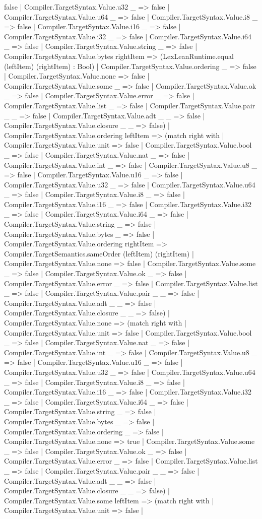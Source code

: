 \documentclass[11pt]{article}
\begin{document}
false | Compiler.TargetSyntax.Value.u32 \_ => false | Compiler.TargetSyntax.Value.u64 \_ => false | Compiler.TargetSyntax.Value.i8 \_ => false | Compiler.TargetSyntax.Value.i16 \_ => false | Compiler.TargetSyntax.Value.i32 \_ => false | Compiler.TargetSyntax.Value.i64 \_ => false | Compiler.TargetSyntax.Value.string \_ => false | Compiler.TargetSyntax.Value.bytes rightItem => (LexLeanRuntime.equal (leftItem) (rightItem) : Bool) | Compiler.TargetSyntax.Value.ordering \_ => false | Compiler.TargetSyntax.Value.none => false | Compiler.TargetSyntax.Value.some \_ => false | Compiler.TargetSyntax.Value.ok \_ => false | Compiler.TargetSyntax.Value.error \_ => false | Compiler.TargetSyntax.Value.list \_ => false | Compiler.TargetSyntax.Value.pair \_ \_ => false | Compiler.TargetSyntax.Value.adt \_ \_ => false | Compiler.TargetSyntax.Value.closure \_ \_ => false) | Compiler.TargetSyntax.Value.ordering leftItem => (match right with | Compiler.TargetSyntax.Value.unit => false | Compiler.TargetSyntax.Value.bool \_ => false | Compiler.TargetSyntax.Value.nat \_ => false | Compiler.TargetSyntax.Value.int \_ => false | Compiler.TargetSyntax.Value.u8 \_ => false | Compiler.TargetSyntax.Value.u16 \_ => false | Compiler.TargetSyntax.Value.u32 \_ => false | Compiler.TargetSyntax.Value.u64 \_ => false | Compiler.TargetSyntax.Value.i8 \_ => false | Compiler.TargetSyntax.Value.i16 \_ => false | Compiler.TargetSyntax.Value.i32 \_ => false | Compiler.TargetSyntax.Value.i64 \_ => false | Compiler.TargetSyntax.Value.string \_ => false | Compiler.TargetSyntax.Value.bytes \_ => false | Compiler.TargetSyntax.Value.ordering rightItem => Compiler.TargetSemantics.sameOrder (leftItem) (rightItem) | Compiler.TargetSyntax.Value.none => false | Compiler.TargetSyntax.Value.some \_ => false | Compiler.TargetSyntax.Value.ok \_ => false | Compiler.TargetSyntax.Value.error \_ => false | Compiler.TargetSyntax.Value.list \_ => false | Compiler.TargetSyntax.Value.pair \_ \_ => false | Compiler.TargetSyntax.Value.adt \_ \_ => false | Compiler.TargetSyntax.Value.closure \_ \_ => false) | Compiler.TargetSyntax.Value.none => (match right with | Compiler.TargetSyntax.Value.unit => false | Compiler.TargetSyntax.Value.bool \_ => false | Compiler.TargetSyntax.Value.nat \_ => false | Compiler.TargetSyntax.Value.int \_ => false | Compiler.TargetSyntax.Value.u8 \_ => false | Compiler.TargetSyntax.Value.u16 \_ => false | Compiler.TargetSyntax.Value.u32 \_ => false | Compiler.TargetSyntax.Value.u64 \_ => false | Compiler.TargetSyntax.Value.i8 \_ => false | Compiler.TargetSyntax.Value.i16 \_ => false | Compiler.TargetSyntax.Value.i32 \_ => false | Compiler.TargetSyntax.Value.i64 \_ => false | Compiler.TargetSyntax.Value.string \_ => false | Compiler.TargetSyntax.Value.bytes \_ => false | Compiler.TargetSyntax.Value.ordering \_ => false | Compiler.TargetSyntax.Value.none => true | Compiler.TargetSyntax.Value.some \_ => false | Compiler.TargetSyntax.Value.ok \_ => false | Compiler.TargetSyntax.Value.error \_ => false | Compiler.TargetSyntax.Value.list \_ => false | Compiler.TargetSyntax.Value.pair \_ \_ => false | Compiler.TargetSyntax.Value.adt \_ \_ => false | Compiler.TargetSyntax.Value.closure \_ \_ => false) | Compiler.TargetSyntax.Value.some leftItem => (match right with | Compiler.TargetSyntax.Value.unit => false | 
\end{document}
